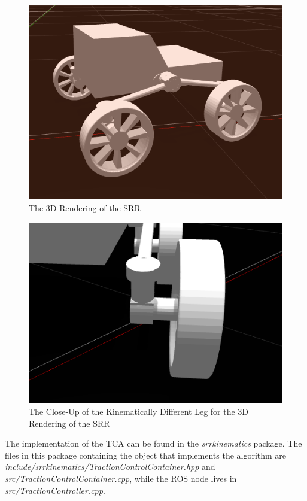\begin{figure}[H]
	\centering
	\includegraphics[width=.8\textwidth]{sections/discussion/images/srr_gazebo.png}
	\caption{The 3D Rendering of the \acl{SRR}}
	\label{traction_control:discussion:srr-gazebo}
\end{figure}

\begin{figure}[H]
	\centering
	\includegraphics[width=.8\textwidth]{sections/discussion/images/srr_gazebo_link.png}
	\caption{The Close-Up of the Kinematically Different Leg for the 3D Rendering of the \acl{SRR}}
	\label{traction_control:discussion:srr-gazebo-link}
\end{figure}

The implementation of the \ac{TCA} can be found in the \textit{srr\textunderscore kinematics} package. The files in this package containing the object that implements the algorithm are \newline \textit{include/srr\textunderscore kinematics/TractionControlContainer.hpp} and \textit{src/TractionControlContainer.cpp}, while the ROS node lives in \textit{src/TractionController.cpp}. \\

